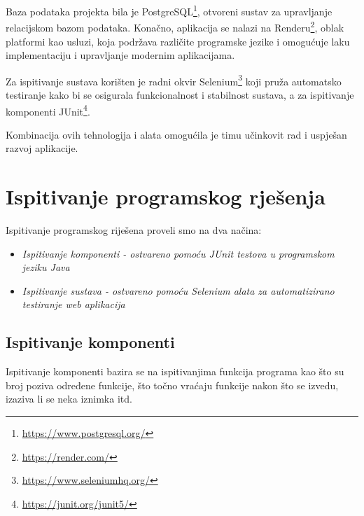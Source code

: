 			 Baza podataka projekta bila je PostgreSQL\footnote{\url{https://www.postgresql.org/}}, otvoreni sustav za upravljanje relacijskom bazom podataka. Konačno, aplikacija se nalazi na Renderu\footnote{\url{https://render.com/}}, oblak platformi kao usluzi, koja podržava različite programske jezike i omogućuje laku implementaciju i upravljanje modernim aplikacijama.
			 
			 Za ispitivanje sustava korišten je radni okvir Selenium\footnote{\url{https://www.seleniumhq.org/}} koji pruža automatsko testiranje kako bi se osigurala funkcionalnost i stabilnost sustava, a za ispitivanje komponenti JUnit\footnote{\url{https://junit.org/junit5/}}.
			 
			 Kombinacija ovih tehnologija i alata omogućila je timu učinkovit rad i uspješan razvoj aplikacije.
			
			
			\eject 
		
	
		\section{Ispitivanje programskog rješenja}
		
			 
			 Ispitivanje programskog riješena proveli smo na dva načina:
			 \begin{itemize}
			 	\item \textit{Ispitivanje komponenti - ostvareno pomoću JUnit testova u programskom jeziku Java}
			 	\item \textit{Ispitivanje sustava - ostvareno pomoću Selenium alata za automatizirano testiranje web aplikacija}
			 \end{itemize}
			 	
			 
			 
	
			
			\subsection{Ispitivanje komponenti}
			Ispitivanje komponenti bazira se na ispitivanjima funkcija programa kao što su broj poziva određene funkcije, što točno vraćaju funkcije nakon što se izvedu, izaziva li se neka iznimka itd.
			
